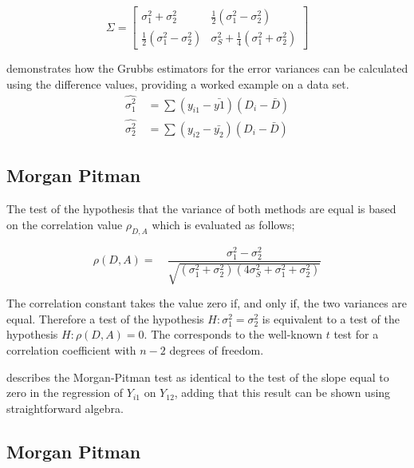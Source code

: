 \documentclass[12pt, a4paper]{article}
\begin{document}
\begin{equation}
	\Sigma = \left[\begin{matrix}
		\sigma^{2}_{1}+\sigma^{2}_{2}&\frac{1}{2}(\sigma^{2}_{1}-\sigma^{2}_{2})\\
		\frac{1}{2}(\sigma^{2}_{1}-\sigma^{2}_{2})&\sigma^{2}_{S}+
		\frac{1}{4}(\sigma^{2}_{1}+\sigma^{2}_{2})
	\end{matrix} \right]
\end{equation}





\citet{Kinsella} demonstrates how the Grubbs estimators for the
error variances can be calculated using the difference values,
providing a worked example on a data set.
\begin{eqnarray}
	\hat{\sigma^{2}_{1}}
	\quad=\sum{(y_{i1}-\bar{y{1}})(D_{i}-\bar{D})}\\
	\hat{\sigma^{2}_{2}} \quad=
	\sum{(y_{i2}-\bar{y_{2}})(D_{i}-\bar{D})} \nonumber
\end{eqnarray}


\subsection{Morgan Pitman}

The test of the hypothesis that the variance of both methods are
equal is based on the correlation value $\rho_{D,A}$ which is
evaluated as follows;

\begin{equation}
	\rho(D,A)=\quad\frac{\sigma^{2}_{1}-\sigma^{2}_{2}}{\sqrt{(\sigma^{2}_{1}+\sigma^{2}_{2})(4\sigma^{2}_{S}+\sigma^{2}_{1}+\sigma^{2}_{2})}}
\end{equation}

The correlation constant takes the value zero if, and only if, the
two variances are equal. Therefore a test of the hypothesis $H:
\sigma^{2}_{1}=\sigma^{2}_{2}$ is equivalent to a test of the
hypothesis $H: \rho(D,A) = 0$. The corresponds to the well-known
$t$ test for a correlation coefficient with $n-2$ degrees of
freedom.

\citet{Bartko} describes the Morgan-Pitman test as identical to
the test of the slope equal to zero in the regression of $Y_{i1}$
on $Y_{12}$, adding that this result can be shown using
straightforward algebra.

\subsection{Morgan Pitman}
\end{document}
